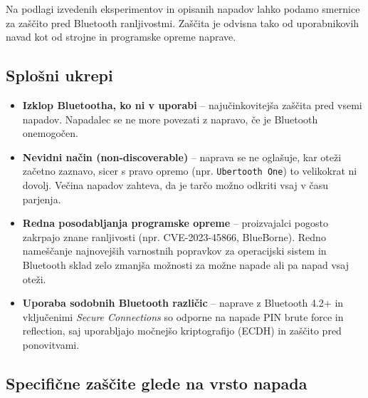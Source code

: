 \documentclass[11pt,a4paper,slovene]{article}
\begin{document}
Na podlagi izvedenih eksperimentov in opisanih napadov lahko podamo smernice za zaščito pred Bluetooth ranljivostmi. Zaščita je odvisna tako od uporabnikovih navad kot od strojne in programske opreme naprave.

\subsection{Splošni ukrepi}

\begin{itemize}
	\item \textbf{Izklop Bluetootha, ko ni v uporabi} – najučinkovitejša zaščita pred vsemi napadov. Napadalec se ne more povezati z napravo, če je Bluetooth onemogočen.
	\item \textbf{Nevidni način (non‑discoverable)} – naprava se ne oglašuje, kar oteži začetno zaznavo, sicer s pravo opremo (npr. \texttt{Ubertooth One}) to velikokrat ni dovolj. Večina napadov zahteva, da je tarčo možno odkriti vsaj v času parjenja.
	\item \textbf{Redna posodabljanja programske opreme} – proizvajalci pogosto zakrpajo znane ranljivosti (npr. CVE-2023-45866, BlueBorne). Redno nameščanje najnovejših varnostnih popravkov za operacijski sistem in Bluetooth sklad zelo zmanjša možnosti za možne napade ali pa napad vsaj oteži.
	\item \textbf{Uporaba sodobnih Bluetooth različic} – naprave z Bluetooth 4.2+ in vključenimi \textit{Secure Connections} so odporne na napade PIN brute force in reflection, saj uporabljajo močnejšo kriptografijo (ECDH) in zaščito pred ponovitvami.
\end{itemize}

\subsection{Specifične zaščite glede na vrsto napada}
\end{document}
